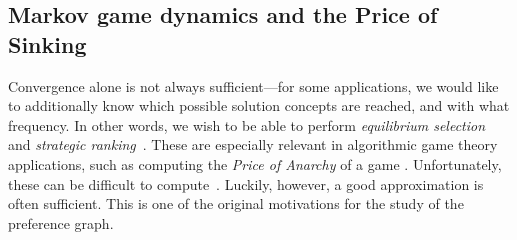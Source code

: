 \documentclass[preprint,authoryear]{elsarticle}
\begin{document}
 
\subsection{Markov game dynamics and the Price of Sinking} \label{sec: markov}

Convergence alone is not always sufficient---for some applications, we would like to additionally know which possible solution concepts are reached, and with what frequency. In other words, we wish to be able to perform \emph{equilibrium selection}~\citep{harsanyi1988general} and \emph{strategic ranking}~\citep{balduzzi_re-evaluating_2018,omidshafiei_-rank_2019}. These are especially relevant in algorithmic game theory applications, such as computing the \emph{Price of Anarchy} of a game \citep{roughgarden2010algorithmic}. Unfortunately, these can be difficult to compute~\citep{goldberg_complexity_2013}. Luckily, however, a good approximation is often sufficient. This is one of the original motivations for the study of the preference graph. %
\end{document}
